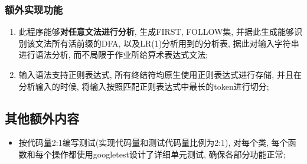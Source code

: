 \subsubsection{额外实现功能}
\begin{enumerate}
	\item 此程序能够\textbf{对任意文法进行分析}, 生成FIRST, FOLLOW集,
	      并据此生成能够识别该文法所有活前缀的DFA, 以及LR(1)分析用到的分析表,
	      据此对输入字符串进行语法分析, 而不局限于作业所给算术表达式文法;
	\item 输入语法支持正则表达式, 所有终结符均原生使用正则表达式进行存储,
	      并且在分析输入的时候, 将输入按照匹配正则表达式中最长的token进行切分;
\end{enumerate}

\subsection{其他额外内容}
\begin{itemize}
	\item 按代码量2:1编写测试(实现代码量和测试代码量比例为2:1), 对每个类,
	      每个函数和每个操作都使用googletest设计了详细单元测试, 确保各部分功能正常;
\end{itemize}

